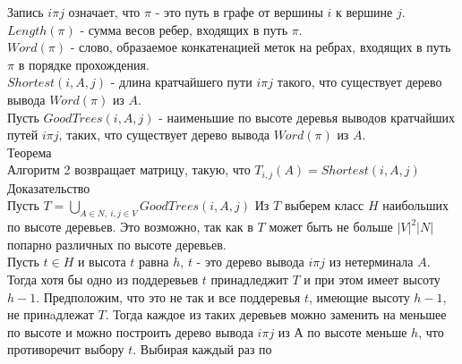         Запись $i\pi j$ означает, что $\pi$ - это путь в графе от вершины $i$ к вершине $j$.\\
        $Length(\pi)$ - сумма весов ребер, входящих в путь $\pi$.\\
        $Word(\pi)$ - слово, образаемое конкатенацией меток на ребрах, входящих в путь $\pi$ в порядке прохождения.\\
        $Shortest(i,A,j)$ - длина кратчайшего пути $i\pi j$ такого, что существует дерево вывода $Word(\pi)$ из $A$.\\
        Пусть $GoodTrees(i,A,j)$ - наименьшие по высоте деревья выводов кратчайших путей $i\pi j$, таких, что существует дерево вывода $Word(\pi)$ из $A$.\\
        
        
        Теорема\\
            Алгоритм 2 возвращает матрицу, такую, что $T_{i,j}(A) = Shortest(i,A,j)$\\
            
            
        Доказательство\\
            Пусть $T = \bigcup_{A \in N,~i,j \in V}GoodTrees(i,A,j)$ Из $T$ выберем класс $H$ наибольших по высоте деревьев. Это возможно, так как в $T$ может быть не больше $|V|^2|N|$ попарно различных по высоте деревьев.\\
                Пусть $t \in H$ и высота $t$ равна $h$, $t$ - это дерево вывода $i\pi j$ из нетерминала $A$. Тогда хотя бы одно из поддеревьев $t$ принадледжит $T$ и при этом имеет высоту $h-1$. Предположим, что это не так и все поддеревья $t$, имеющие высоту $h-1$, не принaдлежат $T$. Тогда каждое из таких деревьев можно заменить на меньшее по высоте и можно построить дерево вывода $i\pi j$ из $А$ по высоте меньше $h$, что противоречит выбору $t$. Выбирая каждый раз по  